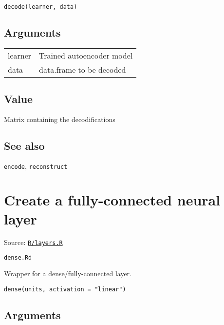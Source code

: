 \begin{verbatim}
decode(learner, data)
\end{verbatim}

\hypertarget{arguments}{\subsection{\texorpdfstring{\protect\hyperlink{arguments}{}Arguments}{Arguments}}\label{arguments}}

\begin{longtable}[c]{@{}>{\small}p{3cm}>{\raggedright}p{12.5cm}@{}}
\toprule
learner & Trained autoencoder model\tabularnewline
data & data.frame to be decoded\tabularnewline
\bottomrule
\end{longtable}

\hypertarget{value}{\subsection{\texorpdfstring{\protect\hyperlink{value}{}Value}{Value}}\label{value}}

Matrix containing the decodifications

\hypertarget{see-also}{\subsection{\texorpdfstring{\protect\hyperlink{see-also}{}See
also}{See also}}\label{see-also}}

\texttt{encode}, \texttt{reconstruct}

\section{Create a fully-connected neural
layer}\label{create-a-fully-connected-neural-layer}

Source:
\href{https://github.com/fdavidcl/ruta/blob/master/R/layers.R}{\texttt{R/layers.R}}

\texttt{dense.Rd}

Wrapper for a dense/fully-connected layer.

\begin{verbatim}
dense(units, activation = "linear")
\end{verbatim}

\hypertarget{arguments}{\subsection{\texorpdfstring{\protect\hyperlink{arguments}{}Arguments}{Arguments}}\label{arguments}}


